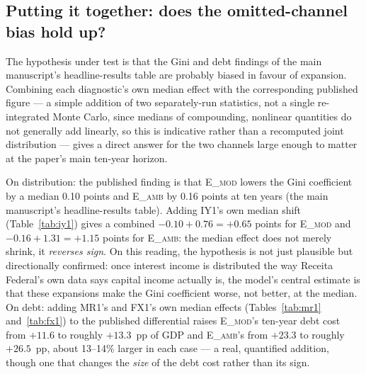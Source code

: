 \documentclass[11pt,a4paper]{article}
\begin{document}
\subsection{Putting it together: does the omitted-channel bias hold up?}
\label{sec:discussion-reviewer-synthesis}

The hypothesis under test is that the Gini and debt findings of the main manuscript's headline-results table are probably biased in favour of expansion. Combining each diagnostic's own median effect with the corresponding published figure --- a simple addition of two separately-run statistics, not a single re-integrated Monte Carlo, since medians of compounding, nonlinear quantities do not generally add linearly, so this is indicative rather than a recomputed joint distribution --- gives a direct answer for the two channels large enough to matter at the paper's main ten-year horizon.

On distribution: the published finding is that \textsc{E\_mod} lowers the Gini coefficient by a median 0.10 points and \textsc{E\_amb} by 0.16 points at ten years (the main manuscript's headline-results table). Adding IY1's own median shift (Table~\ref{tab:iy1}) gives a combined $-0.10+0.76=+0.65$ points for \textsc{E\_mod} and $-0.16+1.31=+1.15$ points for \textsc{E\_amb}: the median effect does not merely shrink, it \emph{reverses sign}. On this reading, the hypothesis is not just plausible but directionally confirmed: once interest income is distributed the way Receita Federal's own data says capital income actually is, the model's central estimate is that these expansions make the Gini coefficient worse, not better, at the median. On debt: adding MR1's and FX1's own median effects (Tables~\ref{tab:mr1} and~\ref{tab:fx1}) to the published differential raises \textsc{E\_mod}'s ten-year debt cost from $+11.6$ to roughly $+13.3$~pp of GDP and \textsc{E\_amb}'s from $+23.3$ to roughly $+26.5$~pp, about 13--14\% larger in each case --- a real, quantified addition, though one that changes the \emph{size} of the debt cost rather than its sign.
\end{document}
